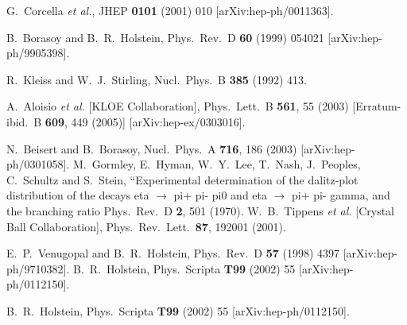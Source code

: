 \documentclass{article}
\begin{document}
\begin{thebibliography}{99}
  G.~Corcella {\it et al.},
  JHEP {\bf 0101} (2001) 010
  [arXiv:hep-ph/0011363].

B.~Borasoy and B.~R.~Holstein,
Phys.\ Rev.\  D {\bf 60} (1999) 054021 [arXiv:hep-ph/9905398].

 R.~Kleiss and W.~J.~Stirling,
Nucl.\ Phys.\  B {\bf 385} (1992) 413.

  A.~Aloisio {\it et al.}  [KLOE Collaboration],
  Phys.\ Lett.\  B {\bf 561}, 55 (2003)
  [Erratum-ibid.\  B {\bf 609}, 449 (2005)]
  [arXiv:hep-ex/0303016].

  N.~Beisert and B.~Borasoy,
  Nucl.\ Phys.\  A {\bf 716}, 186 (2003)
  [arXiv:hep-ph/0301058].
  M.~Gormley, E.~Hyman, W.~Y.~Lee, T.~Nash, J.~Peoples, C.~Schultz and S.~Stein,
   ``Experimental determination of the dalitz-plot distribution of the decays
   eta $\to$ pi+ pi- pi0 and eta $\to$ pi+ pi- gamma, and the branching ratio
  Phys.\ Rev.\  D {\bf 2}, 501 (1970).
  W.~B.~Tippens {\it et al.}  [Crystal Ball Collaboration],
  Phys.\ Rev.\ Lett.\  {\bf 87}, 192001 (2001).

 E.~P.~Venugopal and B.~R.~Holstein,
Phys.\ Rev.\  D {\bf 57} (1998) 4397 [arXiv:hep-ph/9710382].
 B.~R.~Holstein,
 Phys.\ Scripta {\bf T99} (2002) 55 [arXiv:hep-ph/0112150].

 B.~R.~Holstein,
 Phys.\ Scripta {\bf T99} (2002) 55 [arXiv:hep-ph/0112150].


\end{thebibliography}
\end{document}
